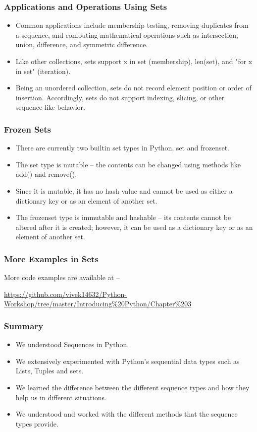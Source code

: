 \documentclass{beamer}
\begin{document}
\begin{frame}
\frametitle{Applications and Operations Using Sets}
\begin{itemize}
\item Common applications include membership testing, removing duplicates from a sequence, and computing mathematical operations such as intersection, union, difference, and symmetric difference.
\item Like other collections, sets support x in set (membership), len(set), and "for x in set" (iteration). 
\item Being an unordered collection, sets do not record element position or order of insertion. Accordingly, sets do not support indexing, slicing, or other sequence-like behavior.
\end{itemize}
\end{frame}

\begin{frame}
\frametitle{Frozen Sets}
\begin{itemize}
\item There are currently two builtin set types in Python, set and frozenset. 
\item The set type is mutable -- the contents can be changed using methods like add() and remove(). 
\item Since it is mutable, it has no hash value and cannot be used as either a dictionary key or as an element of another set. 
\item The frozenset type is immutable and hashable -- its contents cannot be altered after it is created; however, it can be used as a dictionary key or as an element of another set.
\end{itemize}
\end{frame}

\begin{frame}
\frametitle{More Examples in Sets}
More code examples are available at --
 
\url{https://github.com/vivek14632/Python-Workshop/tree/master/Introducing\%20Python/Chapter\%203}
\end{frame}


\begin{frame}
\frametitle{Summary}
\begin{itemize}
\item We understood Sequences in Python.
\item We extensively experimented with Python's sequential data types such as Lists, Tuples and sets.
\item We learned the difference between the different sequence types and how they help us in different situations.
\item We understood and worked with the different methods that the sequence types provide.
\end{itemize}
\end{frame}
\end{document}
